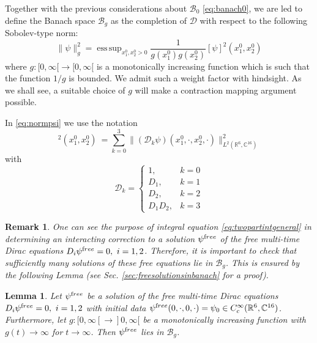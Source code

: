 \documentclass[b5paper,draft,openbib,12pt]{memoir}
\newtheorem{Lemma}[Def]{Lemma}
\newtheorem{Remark}[Def]{Remark}
\newcommand{\R}{\mathbb{R}}
\newcommand{\CC}{\mathbb{C}}
\newcommand{\free}{{\textup free}}
\newcommand{\Banach}{\mathscr{B}}
\DeclareMathOperator*{\esssup}{ess \, sup}
\begin{document}
Together with the previous considerations about $\Banach_0$ \eqref{eq:banach0}, we are led to define the Banach space $\Banach_g$ as the completion of $\mathscr{D}$ with respect to the following Sobolev-type norm:
\begin{equation}
	\| \psi \|^2_g = \esssup_{x_1^0,x_2^0 >0} \frac{1}{g(x_1^0)g(x_2^0)} [\psi]^2(x_1^0,x_2^0)
\label{eq:normpsi}
\end{equation}
where \(g : [0,\infty[ \rightarrow [0,\infty[ \) is a monotonically increasing function which is such that the function $1/g$ is bounded. We admit such a weight factor with hindsight. As we shall see, a suitable choice of $g$ will make a contraction mapping argument possible.

In \eqref{eq:normpsi} we use the notation
\begin{equation}
	[\psi]^2(x_1^0,x_2^0) ~= \sum_{k=0}^3 \| (\mathcal{D}_k \psi)(x_1^0, \cdot, x_2^0,\cdot)\|^2_{L^2(\R^6,\CC^{16})}
\label{eq:spatialnorm}
\end{equation}
with
\begin{equation}
	\mathcal{D}_k = \left\{ \begin{array}{cl} 1, &k=0\\ D_1, & k=1\\ D_2, & k=2 \\ D_1 D_2, & k=3 \end{array}\right. 
\label{eq:defdk}
\end{equation}

\begin{Remark} 
  One can see the purpose of integral equation \eqref{eq:twopartintgeneral} in 
  determining an interacting correction to a solution $\psi^\free$ 
  of the free multi-time Dirac equations $D_i \psi^\free = 0,~i=1,2$. 
  Therefore, it is important to check that sufficiently many 
  solutions of these free equations lie in $\Banach_g$. This is 
  ensured by the following Lemma (see Sec. 
  \ref{sec:freesolutionsinbanach} for a proof).

\end{Remark}

\begin{Lemma}
  Let $\psi^\free$ be a solution of the free multi-time Dirac 
  equations $D_i \psi^\free = 0,~i=1,2$ with initial data 
  $\psi^\free(0,\cdot,0,\cdot) = \psi_0 \in C_c^\infty(\R^6,\CC^{16})$. 
  Furthermore, let $g : [0,\infty[ \rightarrow ]0,\infty[$ be a 
  monotonically increasing function with $g(t) \rightarrow \infty$ 
  for $t \rightarrow \infty$. Then $\psi^\free$ lies 
  in $\Banach_g$.
	\label{thm:freesolutionsinbanach}
\end{Lemma}
\end{document}
